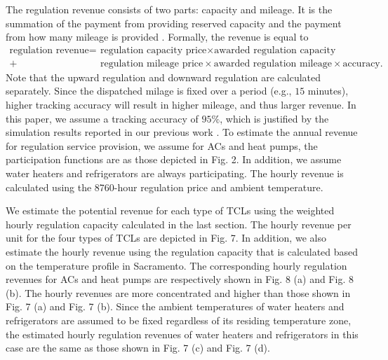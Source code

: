 \documentclass[onecolumn,journal]{IEEEtran}
\begin{document}
The regulation revenue consists of two parts: capacity and mileage. It is the summation of the payment from providing reserved capacity and the payment from how many mileage is provided \cite{CAISO_755}. Formally, the revenue is equal to 
\begin{align*}
\text{regulation revenue} = &\text{ regulation capacity price} \times \text{awarded regulation capacity} \\
                + &\text{ regulation mileage price} \times \text{awarded regulation mileage}\times \text{accuracy}.
\end{align*}
Note that the upward regulation and downward regulation are calculated separately. Since the dispatched milage is fixed over a period (e.g., $15$ minutes), higher tracking accuracy will result in higher mileage, and thus larger revenue. In this paper, we assume a tracking accuracy of $95\%$, which is justified by the simulation results reported in our previous work \cite{HH_BS_KP_TV_ACC:2014}. To estimate the annual revenue for regulation service provision, we assume for ACs and heat pumps, the participation functions are as those depicted in Fig.  2. In addition, we assume water heaters and refrigerators are always participating. The hourly revenue is calculated using the 8760-hour regulation price and ambient temperature. 

We estimate the potential revenue for each type of TCLs using the weighted hourly regulation capacity calculated in the last section. The hourly revenue per unit for the four types of TCLs are depicted in Fig.  7. In addition, we also estimate the hourly revenue using the regulation capacity that is calculated based on the temperature profile in Sacramento. The corresponding hourly regulation revenues for ACs and heat pumps are respectively shown in Fig.  8 (a) and Fig.  8 (b). The hourly revenues are more concentrated and higher than those shown in Fig.  7 (a) and Fig.  7 (b). Since the ambient temperatures of water heaters and refrigerators are assumed to be fixed regardless of its residing temperature zone, the estimated hourly regulation revenues of water heaters and refrigerators in this case are the same as those shown in Fig.  7 (c) and Fig.  7 (d).
\end{document}
